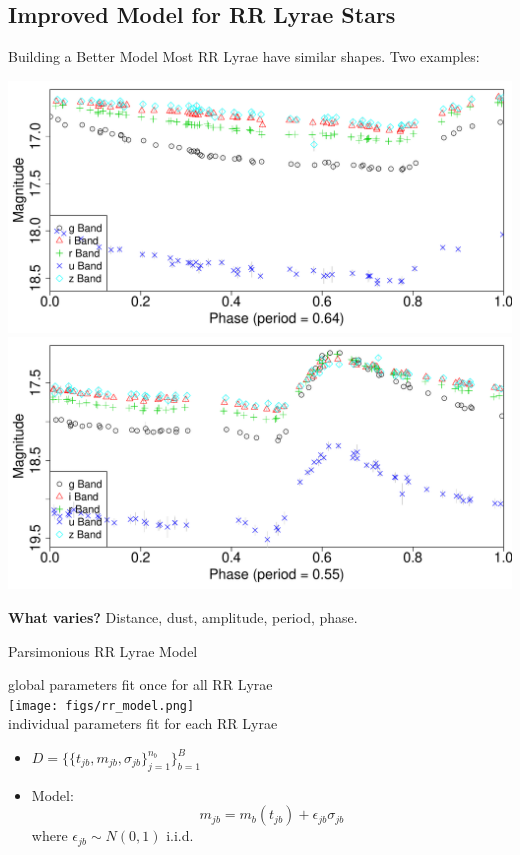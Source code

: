 \documentclass[12pt]{beamer}
\begin{document}
\subsection{Improved Model for RR Lyrae Stars}

\begin{frame}{Building a Better Model}
Most RR Lyrae have similar shapes. Two examples:

\begin{center}
\includegraphics[scale=0.2]{figs/folded_4099.pdf}\\
\includegraphics[scale=0.2]{figs/folded_13350.pdf}
\end{center}

\textbf{What varies?} Distance, dust, amplitude, period, phase.
\end{frame}

\begin{frame}{Parsimonious RR Lyrae Model}


\begin{center}
global parameters fit once for all RR Lyrae\\
\texttt{[image: figs/rr\_model.png]}\\
individual parameters fit for each RR Lyrae
\end{center}

\vspace{.2in}

\begin{itemize}
\item $D=\{\{t_{jb},m_{jb},\sigma_{jb}\}_{j=1}^{n_b}\}_{b=1}^B$
\item Model:
\begin{equation*}
m_{jb} = m_b(t_{jb}) + \epsilon_{jb}\sigma_{jb}
\end{equation*}
where $\epsilon_{jb} \sim N(0,1)$ i.i.d.
\end{itemize}
\end{frame}
\end{document}
